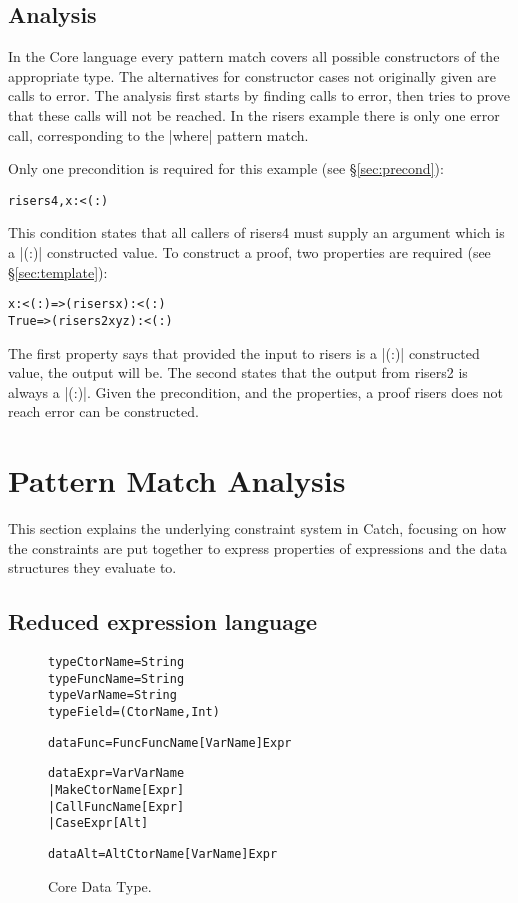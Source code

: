 \documentclass[preprint]{sigplanconf}
\newcommand{\C}[1]{\textsf{#1}}
\newenvironment{code}{\begin{alltt}\small}{\end{alltt}}
\begin{document}
\subsection{Analysis}

In the Core language every pattern match covers all possible constructors of the appropriate type. The alternatives for constructor cases not originally given are calls to \C{error}. The analysis first starts by finding calls to \C{error}, then tries to prove that these calls will not be reached. In the \C{risers} example there is only one \C{error} call, corresponding to the |where| pattern match.

Only one precondition is required for this example (see \S\ref{sec:precond}):

\begin{code}
risers4, x :< (:)
\end{code}

This condition states that all callers of \C{risers4} must supply an argument which is a |(:)| constructed value. To construct a proof, two properties are required (see \S\ref{sec:template}):

\begin{code}
x :< (:)  => (risers x       ) :< (:)
True      => (risers2 x y z  ) :< (:)
\end{code}

The first property says that provided the input to \C{risers} is a |(:)| constructed value, the output will be. The second states that the output from \C{risers2} is always a |(:)|. Given the precondition, and the properties, a proof \C{risers} does not reach \C{error} can be constructed.

\section{Pattern Match Analysis}
\label{sec:manipulate}

This section explains the underlying constraint system in Catch, focusing on how the constraints are put together to express properties of expressions and the data structures they evaluate to.

\subsection{Reduced expression language}
\label{sec:core}

\begin{figure}
\begin{code}
type CtorName  =  String
type FuncName  =  String
type VarName   =  String
type Field     =  (CtorName, Int)

data Func  =  Func FuncName [VarName] Expr

data Expr  =  Var   VarName
           |  Make  CtorName  [Expr]
           |  Call  FuncName  [Expr]
           |  Case  Expr      [Alt]

data Alt   =  Alt CtorName [VarName] Expr
\end{code}
\caption{Core Data Type.}
\label{fig:core}
\end{figure}
\end{document}
